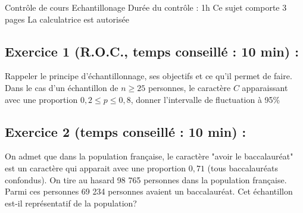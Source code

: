 

\usepackage[c]{esvect}
\newcommand{\covec}[2]{\begin{pmatrix}#1 \\#2 \end{pmatrix}}


\center
\Large Contrôle de cours
\flushleft
\center
Echantillonage
\flushleft \normalsize
Durée du contrôle : 1h\newline
Ce sujet comporte 3 pages\newline
La calculatrice est autorisée
\subsection*{Exercice 1 (R.O.C., temps conseillé : 10 min) : }
Rappeler le principe d'échantillonnage, ses objectifs et ce qu'il permet de faire. Dans le cas d'un échantillon de $n\geq 25$ personnes, le caractère $C$ apparaissant avec une proportion $0,2 \leq p \leq 0,8$, donner l'intervalle de fluctuation à 95\%
\subsection*{Exercice 2 (temps conseillé : 10 min) : }
On admet que dans la population française, le caractère "avoir le baccalauréat" est un caractère qui apparait avec une proportion $0,71$ (tous baccalauréats confondus). On tire au hasard 98 765 personnes dans la population française. Parmi ces personnes 69 234 personnes avaient un baccalauréat. Cet échantillon est-il représentatif de la population?
